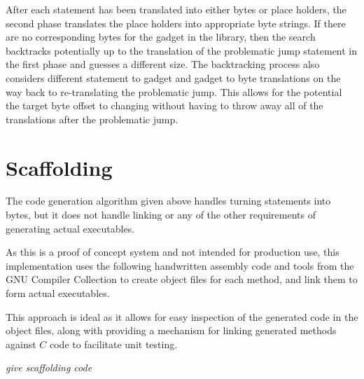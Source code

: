     After each statement has been translated into either bytes or place holders,
    the second phase translates the place holders into appropriate byte strings.
    If there are no corresponding bytes for the gadget in the library, then the
    search backtracks potentially up to the translation of the problematic jump
    statement in the first phase and guesses a different size. The backtracking
    process also considers different statement to gadget and gadget to byte
    translations on the way back to re-translating the problematic jump. This
    allows for the potential the target byte offset to changing without having
    to throw away all of the translations after the problematic jump.

    \section{Scaffolding}

    The code generation algorithm given above handles turning statements into
    bytes, but it does not handle linking or any of the other requirements of
    generating actual executables.

    As this is a proof of concept system and not intended for production use,
    this implementation uses the following handwritten assembly code and tools
    from the GNU Compiler Collection to create object files for each method, and
    link them to form actual executables.

    This approach is ideal as it allows for easy inspection of the generated
    code in the object files, along with providing a mechanism for linking
    generated methods against $C$ code to facilitate unit testing.

    \emph{give scaffolding code}


